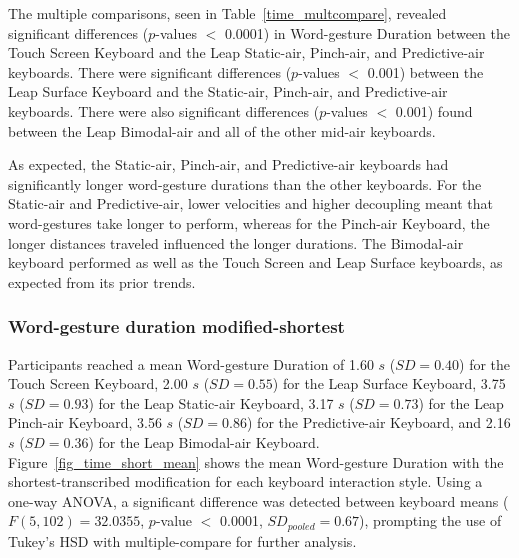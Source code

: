 The multiple comparisons, seen in Table~\ref{time_multcompare}, revealed significant differences ($p$-values $<$ 0.0001) in Word-gesture Duration between the Touch Screen Keyboard and the Leap Static-air, Pinch-air, and Predictive-air keyboards. There were significant differences ($p$-values $<$ 0.001) between the Leap Surface Keyboard and the Static-air, Pinch-air, and Predictive-air keyboards. There were also significant differences ($p$-values $<$ 0.001) found between the Leap Bimodal-air and all of the other mid-air keyboards.

As expected, the Static-air, Pinch-air, and Predictive-air keyboards had significantly longer word-gesture durations than the other keyboards. For the Static-air and Predictive-air, lower velocities and higher decoupling meant that word-gestures take longer to perform, whereas for the Pinch-air Keyboard, the longer distances traveled influenced the longer durations. The Bimodal-air keyboard performed as well as the Touch Screen and Leap Surface keyboards, as expected from its prior trends. 

\subsubsection{Word-gesture duration modified-shortest}
Participants reached a mean Word-gesture Duration of 1.60 $s$ ($SD = 0.40$) for the Touch Screen Keyboard, 2.00 $s$ ($SD = 0.55$) for the Leap Surface Keyboard, 3.75 $s$ ($SD = 0.93$) for the Leap Static-air Keyboard, 3.17 $s$ ($SD = 0.73$) for the Leap Pinch-air Keyboard, 3.56 $s$ ($SD = 0.86$) for the Predictive-air Keyboard, and 2.16 $s$ ($SD = 0.36$) for the Leap Bimodal-air Keyboard. Figure~\ref{fig_time_short_mean} shows the mean Word-gesture Duration with the shortest-transcribed modification for each keyboard interaction style. Using a one-way ANOVA, a significant difference was detected between keyboard means ($F(5, 102) = 32.0355$, $p$-value $<$ 0.0001, $SD_{pooled} = 0.67$), prompting the use of Tukey's HSD with multiple-compare for further analysis.

